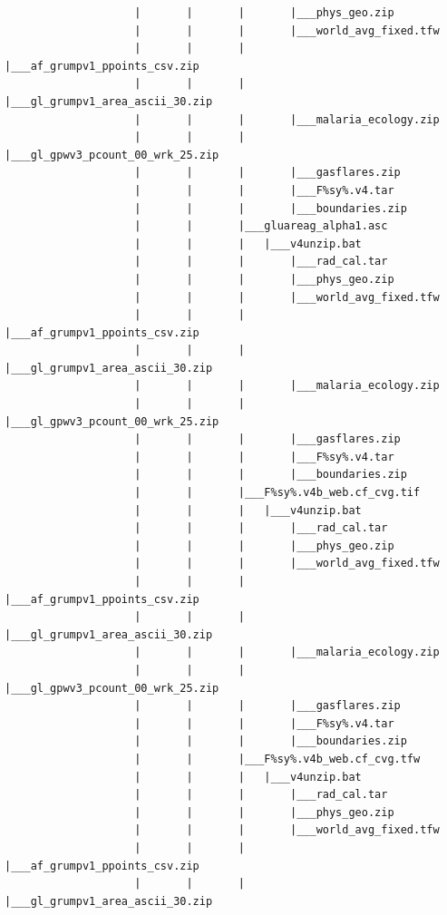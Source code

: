 \documentclass[]{book}
\begin{document}
\begin{verbatim}
                    |       |       |       |___phys_geo.zip
                    |       |       |       |___world_avg_fixed.tfw
                    |       |       |       |___af_grumpv1_ppoints_csv.zip
                    |       |       |       |___gl_grumpv1_area_ascii_30.zip
                    |       |       |       |___malaria_ecology.zip
                    |       |       |       |___gl_gpwv3_pcount_00_wrk_25.zip
                    |       |       |       |___gasflares.zip
                    |       |       |       |___F%sy%.v4.tar
                    |       |       |       |___boundaries.zip
                    |       |       |___gluareag_alpha1.asc
                    |       |       |   |___v4unzip.bat
                    |       |       |       |___rad_cal.tar
                    |       |       |       |___phys_geo.zip
                    |       |       |       |___world_avg_fixed.tfw
                    |       |       |       |___af_grumpv1_ppoints_csv.zip
                    |       |       |       |___gl_grumpv1_area_ascii_30.zip
                    |       |       |       |___malaria_ecology.zip
                    |       |       |       |___gl_gpwv3_pcount_00_wrk_25.zip
                    |       |       |       |___gasflares.zip
                    |       |       |       |___F%sy%.v4.tar
                    |       |       |       |___boundaries.zip
                    |       |       |___F%sy%.v4b_web.cf_cvg.tif
                    |       |       |   |___v4unzip.bat
                    |       |       |       |___rad_cal.tar
                    |       |       |       |___phys_geo.zip
                    |       |       |       |___world_avg_fixed.tfw
                    |       |       |       |___af_grumpv1_ppoints_csv.zip
                    |       |       |       |___gl_grumpv1_area_ascii_30.zip
                    |       |       |       |___malaria_ecology.zip
                    |       |       |       |___gl_gpwv3_pcount_00_wrk_25.zip
                    |       |       |       |___gasflares.zip
                    |       |       |       |___F%sy%.v4.tar
                    |       |       |       |___boundaries.zip
                    |       |       |___F%sy%.v4b_web.cf_cvg.tfw
                    |       |       |   |___v4unzip.bat
                    |       |       |       |___rad_cal.tar
                    |       |       |       |___phys_geo.zip
                    |       |       |       |___world_avg_fixed.tfw
                    |       |       |       |___af_grumpv1_ppoints_csv.zip
                    |       |       |       |___gl_grumpv1_area_ascii_30.zip

\end{verbatim}
\end{document}
